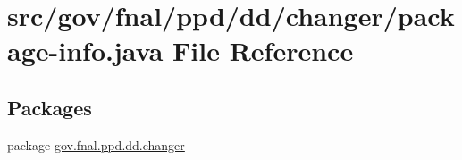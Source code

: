 \hypertarget{dd_2changer_2package-info_8java}{\section{src/gov/fnal/ppd/dd/changer/package-\/info.java File Reference}
\label{dd_2changer_2package-info_8java}
}
\subsection*{Packages}
\begin{DoxyCompactItemize}
\item 
package \hyperlink{namespacegov_1_1fnal_1_1ppd_1_1dd_1_1changer}{gov.\-fnal.\-ppd.\-dd.\-changer}
\end{DoxyCompactItemize}
